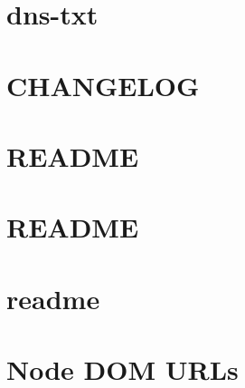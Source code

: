 \documentclass[twoside]{book}
\newcommand{\+}{\discretionary{\mbox{\scriptsize$\hookleftarrow$}}{}{}}
\begin{document}
\chapter{dns-\/txt}
\label{md__c_1_workspace_demo_src_main_script_node_modules_dns-txt__r_e_a_d_m_e}

\chapter{C\+H\+A\+N\+G\+E\+L\+OG}
\label{md__c_1_workspace_demo_src_main_script_node_modules_doctrine__c_h_a_n_g_e_l_o_g}

\chapter{R\+E\+A\+D\+ME}
\label{md__c_1_workspace_demo_src_main_script_node_modules_doctrine__r_e_a_d_m_e}

\chapter{R\+E\+A\+D\+ME}
\label{md__c_1_workspace_demo_src_main_script_node_modules_dom-converter__r_e_a_d_m_e}

\chapter{readme}
\label{md__c_1_workspace_demo_src_main_script_node_modules_dom-serializer_node_modules_domelementtype_readme}

\chapter{Node D\+OM U\+R\+Ls}
\label{md__c_1_workspace_demo_src_main_script_node_modules_dom-urls__r_e_a_d_m_e}

\end{document}
